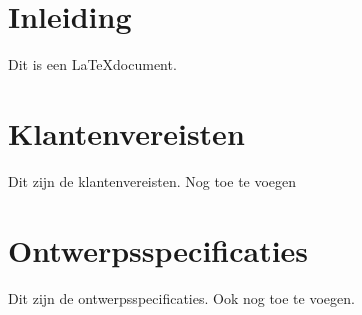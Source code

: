 \documentclass{article}
\begin{document}
\section{Inleiding}

Dit is een \LaTeX document.

\section{Klantenvereisten}

Dit zijn de klantenvereisten.
Nog toe te voegen

\section{Ontwerpsspecificaties}

Dit zijn de ontwerpsspecificaties.
Ook nog toe te voegen.
\end{document}
